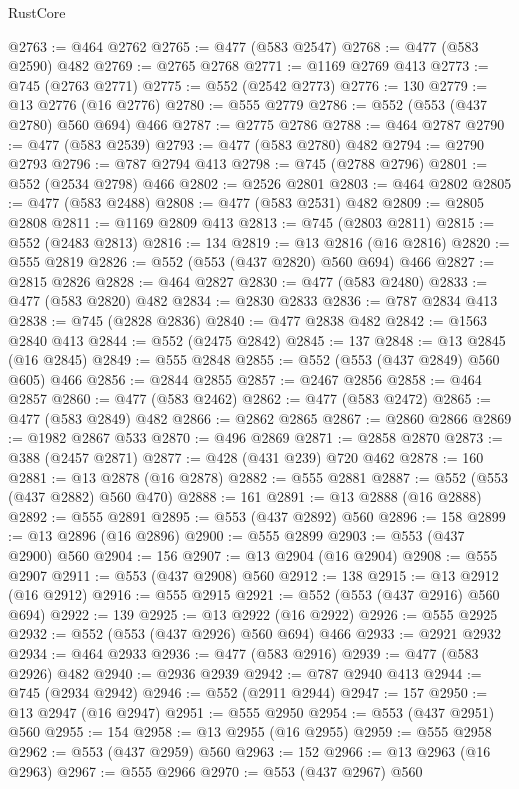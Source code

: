 \begin{lexlean}{RustCore}
\begin{coremodule}
@2763 := @464 @2762
@2765 := @477 (@583 @2547)
@2768 := @477 (@583 @2590) @482
@2769 := @2765 @2768
@2771 := @1169 @2769 @413
@2773 := @745 (@2763 @2771)
@2775 := @552 (@2542 @2773)
@2776 := 130
@2779 := @13 @2776 (@16 @2776)
@2780 := @555 @2779
@2786 := @552 (@553 (@437 @2780) @560 @694) @466
@2787 := @2775 @2786
@2788 := @464 @2787
@2790 := @477 (@583 @2539)
@2793 := @477 (@583 @2780) @482
@2794 := @2790 @2793
@2796 := @787 @2794 @413
@2798 := @745 (@2788 @2796)
@2801 := @552 (@2534 @2798) @466
@2802 := @2526 @2801
@2803 := @464 @2802
@2805 := @477 (@583 @2488)
@2808 := @477 (@583 @2531) @482
@2809 := @2805 @2808
@2811 := @1169 @2809 @413
@2813 := @745 (@2803 @2811)
@2815 := @552 (@2483 @2813)
@2816 := 134
@2819 := @13 @2816 (@16 @2816)
@2820 := @555 @2819
@2826 := @552 (@553 (@437 @2820) @560 @694) @466
@2827 := @2815 @2826
@2828 := @464 @2827
@2830 := @477 (@583 @2480)
@2833 := @477 (@583 @2820) @482
@2834 := @2830 @2833
@2836 := @787 @2834 @413
@2838 := @745 (@2828 @2836)
@2840 := @477 @2838 @482
@2842 := @1563 @2840 @413
@2844 := @552 (@2475 @2842)
@2845 := 137
@2848 := @13 @2845 (@16 @2845)
@2849 := @555 @2848
@2855 := @552 (@553 (@437 @2849) @560 @605) @466
@2856 := @2844 @2855
@2857 := @2467 @2856
@2858 := @464 @2857
@2860 := @477 (@583 @2462)
@2862 := @477 (@583 @2472)
@2865 := @477 (@583 @2849) @482
@2866 := @2862 @2865
@2867 := @2860 @2866
@2869 := @1982 @2867 @533
@2870 := @496 @2869
@2871 := @2858 @2870
@2873 := @388 (@2457 @2871)
@2877 := @428 (@431 @239) @720 @462
@2878 := 160
@2881 := @13 @2878 (@16 @2878)
@2882 := @555 @2881
@2887 := @552 (@553 (@437 @2882) @560 @470)
@2888 := 161
@2891 := @13 @2888 (@16 @2888)
@2892 := @555 @2891
@2895 := @553 (@437 @2892) @560
@2896 := 158
@2899 := @13 @2896 (@16 @2896)
@2900 := @555 @2899
@2903 := @553 (@437 @2900) @560
@2904 := 156
@2907 := @13 @2904 (@16 @2904)
@2908 := @555 @2907
@2911 := @553 (@437 @2908) @560
@2912 := 138
@2915 := @13 @2912 (@16 @2912)
@2916 := @555 @2915
@2921 := @552 (@553 (@437 @2916) @560 @694)
@2922 := 139
@2925 := @13 @2922 (@16 @2922)
@2926 := @555 @2925
@2932 := @552 (@553 (@437 @2926) @560 @694) @466
@2933 := @2921 @2932
@2934 := @464 @2933
@2936 := @477 (@583 @2916)
@2939 := @477 (@583 @2926) @482
@2940 := @2936 @2939
@2942 := @787 @2940 @413
@2944 := @745 (@2934 @2942)
@2946 := @552 (@2911 @2944)
@2947 := 157
@2950 := @13 @2947 (@16 @2947)
@2951 := @555 @2950
@2954 := @553 (@437 @2951) @560
@2955 := 154
@2958 := @13 @2955 (@16 @2955)
@2959 := @555 @2958
@2962 := @553 (@437 @2959) @560
@2963 := 152
@2966 := @13 @2963 (@16 @2963)
@2967 := @555 @2966
@2970 := @553 (@437 @2967) @560

\end{coremodule}
\end{lexlean}
